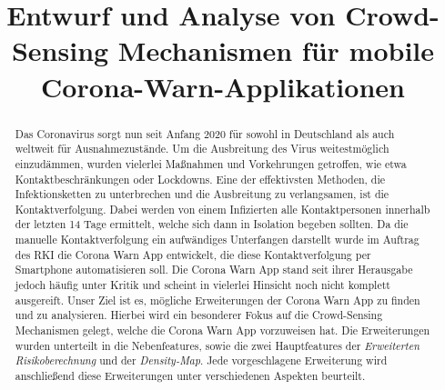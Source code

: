 \documentclass[conference,compsoc]{IEEEtran}
\begin{document}
\title{Entwurf und Analyse von Crowd-Sensing Mechanismen für mobile Corona-Warn-Applikationen}

\author{
\and
{} 
\and
{}
\and
{}
}

\maketitle

\begin{abstract}
Das Coronavirus sorgt nun seit Anfang 2020 für sowohl in Deutschland als auch weltweit für Ausnahmezustände. 
Um die Ausbreitung des Virus weitestmöglich einzudämmen, wurden vielerlei Maßnahmen und Vorkehrungen getroffen, wie etwa Kontaktbeschränkungen oder Lockdowns.
Eine der effektivsten Methoden, die Infektionsketten zu unterbrechen und die Ausbreitung zu verlangsamen, ist die Kontaktverfolgung. 
Dabei werden von einem Infizierten alle Kontaktpersonen innerhalb der letzten 14 Tage ermittelt, welche sich dann in Isolation begeben sollten. 
Da die manuelle Kontaktverfolgung ein aufwändiges Unterfangen darstellt wurde im Auftrag des RKI die Corona Warn App entwickelt, die diese Kontaktverfolgung per Smartphone automatisieren soll. 
Die Corona Warn App stand seit ihrer Herausgabe jedoch häufig unter Kritik und scheint in vielerlei Hinsicht noch nicht komplett ausgereift.
Unser Ziel ist es, mögliche Erweiterungen der Corona Warn App zu finden und zu analysieren.
Hierbei wird ein besonderer Fokus auf die Crowd-Sensing Mechanismen gelegt, welche die Corona Warn App vorzuweisen hat. 
Die Erweiterungen wurden unterteilt in die Nebenfeatures, sowie die zwei Hauptfeatures der \textit{Erweiterten Risikoberechnung} und der \textit{Density-Map}.
Jede vorgeschlagene Erweiterung wird anschließend diese Erweiterungen unter verschiedenen Aspekten beurteilt. 
\end{abstract}
\end{document}
